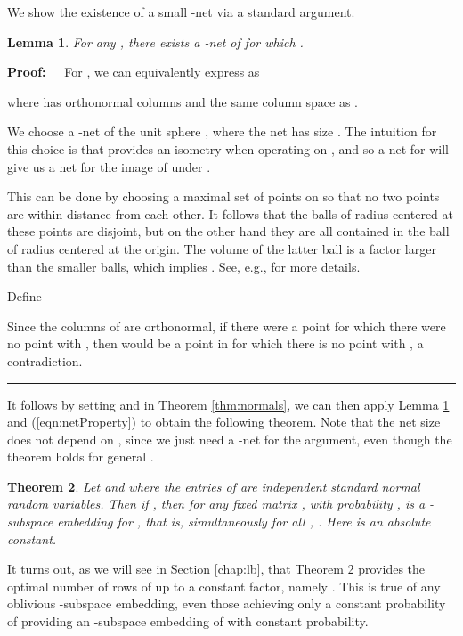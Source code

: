 \documentclass[11pt]{article}
\newtheorem{theorem}{Theorem}
\newtheorem{lemma}[theorem]{Lemma}
\newenvironment{proof}{\begin{trivlist} \item {\bf Proof:~~}}
  {\qed\end{trivlist}}
\def\qed{\hfill\rule{2mm}{2mm}}
\begin{document}
We show the existence of a small -net  via a standard argument.  
\begin{lemma}\label{lem:epsL2net}
For any , 
there exists a -net  of  for which . 
\end{lemma}
\begin{proof}
For , we can equivalently express  as 

where  has orthonormal columns and the same column space as . 

We choose a -net  of the unit sphere , where the  net has
size . The intuition for this choice is that  provides an isometry when operating on ,
and so a net for  will give us a net for the image of  under . 

This can
be done by choosing a maximal set  of points on  so that no two points are within
distance  from each other. It follows that the balls of radius  centered at these points are
disjoint, but on the other hand they are all contained in the ball of radius  centered at the origin. 
The volume of the latter ball is a factor  larger than the smaller balls, which
implies . See, e.g., \cite{m02} for more details.

Define 

Since the columns of  are orthonormal, if there were a point  for which there
were no point  with , 
then  would be a point in 
for which there is no point  with , a contradiction. 
\end{proof}

It follows by setting  and  in Theorem \ref{thm:normals}, 
we can then apply Lemma \ref{lem:epsL2net} and (\ref{eqn:netProperty}) to obtain the following theorem. 
Note that the net size
does not depend on , since we just need a -net for the argument, even though the theorem holds for
general . 
\begin{theorem}\label{thm:gaussianSE}
Let  and  where the entries
 of  are independent standard normal random variables. Then if ,
then for any fixed  matrix , with probability ,  is a 
-subspace embedding for , that is, simultaneously for all ,
. Here  is an absolute constant. 
\end{theorem}
It turns out, as we will see in Section \ref{chap:lb}, that Theorem \ref{thm:gaussianSE} provides the
optimal number of rows of  up to a constant factor, namely . This is true of
any oblivious  -subspace embedding, even those achieving only a constant probability
of providing an -subspace embedding of  with constant probability. 
\end{document}
